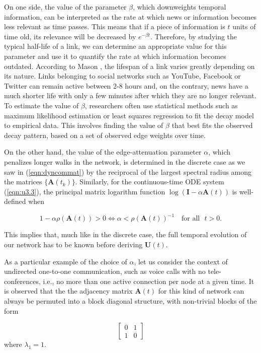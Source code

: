 On one side, the value of the parameter $\beta$, which downweights temporal information, can be interpreted as the rate at which news or information becomes less relevant as time passes. This means that if a piece of information is $t$ units of time old, its relevance will be decreased by $e^{−\beta t}$. Therefore, by studying the typical half-life of a link, we can determine an appropriate value for this parameter and use it to quantify the rate at which information becomes outdated. According to Mason \cite{lifespan}, the lifespan of a link varies greatly depending on its nature. Links belonging to social networks such as YouTube, Facebook or Twitter can remain active between 2-8 hours and, on the contrary, news have a much shorter life with only a few minutes after which they are no longer relevant. To estimate the value of $\beta$, researchers often use statistical methods such as maximum likelihood estimation or least squares regression to fit the decay model to empirical data. This involves finding the value of $\beta$ that best fits the observed decay pattern, based on a set of observed edge weights over time.

On the other hand, the value of the edge-attenuation parameter $\alpha$, which penalizes longer walks in the network, is determined in the discrete case as we saw in (\ref{eqn:dyncommat}) by the reciprocal of the largest spectral radius among the matrices $\{\mathbf{A}(t_k)\}$. Similarly, for the continuous-time ODE system (\ref{eqn:u3.3}), the principal matrix logarithm function $\log (\mathbf{I} - \alpha \mathbf{A}(t))$ is well-defined when \cite[Ch.\ 11]{higham2008functions} 

$$1 - \alpha\rho(\mathbf{A}(t)) > 0 \iff \alpha < \rho(\mathbf{A}(t))^{-1} \text{~~~for all~~} t>0.$$

This implies that, much like in the discrete case, the full temporal evolution of our network has to be known before deriving $\mathbf{U}(t)$.

As a particular example of the choice of $\alpha$, let us consider the context of undirected one-to-one communication, such as voice calls with no tele-conferences, i.e., no more than one active connection per node at a given time. It is observed that the the adjacency matrix $\mathbf{A}(t)$ for this kind of network can always be permuted into a block diagonal structure, with non-trivial blocks of the form

$$\begin{bmatrix}
0 & 1\\
1 & 0 
\end{bmatrix}$$ where $\lambda_1=1$.

